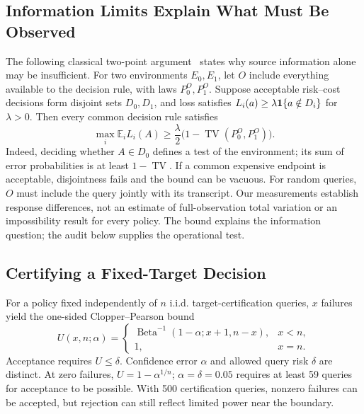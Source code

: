 \subsection{Information Limits Explain What Must Be Observed}
\label{sec:information-limit}
The following classical two-point argument~\cite{yu1997assouad} states why source information alone may be insufficient. For two environments $E_0,E_1$, let $O$ include everything available to the decision rule, with laws $P_0^O,P_1^O$. Suppose acceptable risk--cost decisions form disjoint sets $D_0,D_1$, and loss satisfies $L_i(a)\ge\lambda\mathbf{1}\{a\notin D_i\}$ for $\lambda>0$. Then every common decision rule satisfies
\begin{equation}
 \max_i\mathbb E_i L_i(A)\ge\frac{\lambda}{2}\bigl(1-\operatorname{TV}(P_0^O,P_1^O)\bigr).\label{eq:information}
\end{equation}
Indeed, deciding whether $A\in D_0$ defines a test of the environment; its sum of error probabilities is at least $1-\operatorname{TV}$. If a common expensive endpoint is acceptable, disjointness fails and the bound can be vacuous. For random queries, $O$ must include the query jointly with its transcript. Our measurements establish response differences, not an estimate of full-observation total variation or an impossibility result for every policy. The bound explains the information question; the audit below supplies the operational test.

\subsection{Certifying a Fixed-Target Decision}
\label{sec:fixed-cert}
For a policy fixed independently of $n$ i.i.d. target-certification queries, $x$ failures yield the one-sided Clopper--Pearson bound~\cite{clopper1934confidence}
\begin{equation}
 U(x,n;\alpha)=\begin{cases}
 \operatorname{Beta}^{-1}(1-\alpha;x+1,n-x),&x<n,\\1,&x=n.
 \end{cases}\label{eq:cp}
\end{equation}
Acceptance requires $U\le\delta$. Confidence error $\alpha$ and allowed query risk $\delta$ are distinct. At zero failures, $U=1-\alpha^{1/n}$; $\alpha=\delta=0.05$ requires at least 59 queries for acceptance to be possible. With 500 certification queries, nonzero failures can be accepted, but rejection can still reflect limited power near the boundary.

